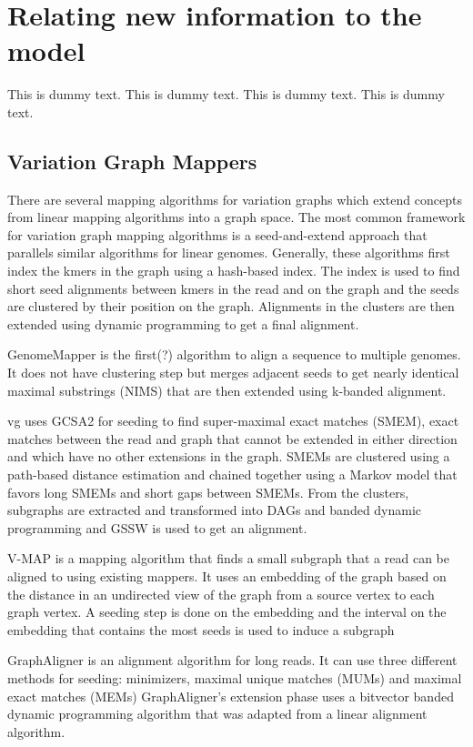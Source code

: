 \section{Relating new information to the model}
This is dummy text. This is dummy text. This is dummy text. This is dummy text. 


\subsection{Variation Graph Mappers}


There are several mapping algorithms for variation graphs which extend concepts from linear mapping algorithms into a graph space.
The most common framework for variation graph mapping algorithms is a seed-and-extend approach that parallels similar algorithms for linear genomes.
Generally, these algorithms first index the kmers in the graph using a hash-based index. 
The index is used to find short seed alignments between kmers in the read and on the graph and the seeds are clustered by their position on the graph.
Alignments in the clusters are then extended using dynamic programming to get a final alignment.

GenomeMapper is the first(?) algorithm to align a sequence to multiple genomes. 
It does not have clustering step but merges adjacent seeds to get nearly identical maximal substrings (NIMS) that are then extended using k-banded alignment.

vg uses GCSA2 for seeding to find super-maximal exact matches (SMEM), exact matches between the read and graph that cannot be extended in either direction and which have no other extensions in the graph. 
SMEMs are clustered using a path-based distance estimation and chained together using a Markov model that favors long SMEMs and short gaps between SMEMs.
From the clusters, subgraphs are extracted and transformed into DAGs and banded dynamic programming and GSSW is used to get an alignment.

V-MAP is a mapping algorithm that finds a small subgraph that a read can be aligned to using existing mappers. 
It uses an embedding of the graph based on the distance in an undirected view of the graph from a source vertex to each graph vertex.
A seeding step is done on the embedding and the interval on the embedding that contains the most seeds is used to induce a subgraph

GraphAligner is an alignment algorithm for long reads.
It can use three different methods for seeding: minimizers, maximal unique matches (MUMs) and maximal exact matches (MEMs)
GraphAligner's extension phase uses a bitvector banded dynamic programming algorithm that was adapted from a linear alignment algorithm.

